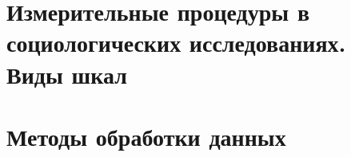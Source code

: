 \section{Измерительные процедуры в социологических исследованиях. Виды шкал}

\section{Методы обработки данных}

  \begin{thebibliography}{9}
     \href{}{}
  \end{thebibliography}
